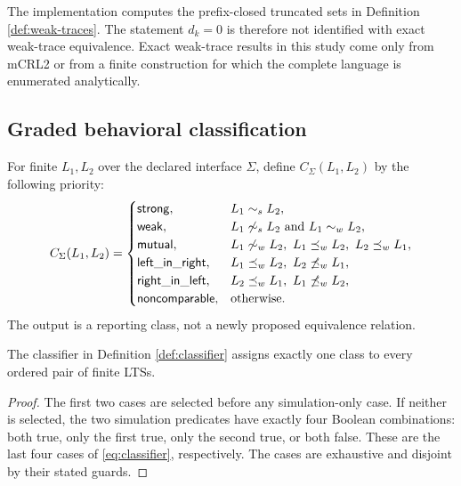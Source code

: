 \documentclass{ws-jbcb}
\numberwithin{equation}{section}
\newcommand{\strongsim}{\mathrel{\sim_{s}}}
\newcommand{\weaksim}{\mathrel{\sim_{w}}}
\newcommand{\weakpre}{\mathrel{\preceq_{w}}}
\begin{document}
The implementation computes the prefix-closed truncated sets in Definition
\ref{def:weak-traces}. The statement $d_k=0$ is therefore not identified with
exact weak-trace equivalence. Exact weak-trace results in this study come only
from mCRL2 or from a finite construction for which the complete language is
enumerated analytically.

\subsection{Graded behavioral classification}\label{sec:decision}

\begin{definition}\label{def:classifier}
For finite $L_1,L_2$ over the declared interface $\Sigma$, define
$C_{\Sigma}(L_1,L_2)$ by the following priority:
\begin{equation}\label{eq:classifier}
C_{\Sigma}(L_1,L_2)=
\begin{cases}
\mathsf{strong}, & L_1\strongsim L_2,\\
\mathsf{weak}, & L_1\not\strongsim L_2\text{ and }L_1\weaksim L_2,\\
\mathsf{mutual}, & L_1\not\weaksim L_2,\ L_1\weakpre L_2,\ L_2\weakpre L_1,\\
\mathsf{left\_in\_right}, & L_1\weakpre L_2,\ L_2\not\weakpre L_1,\\
\mathsf{right\_in\_left}, & L_2\weakpre L_1,\ L_1\not\weakpre L_2,\\
\mathsf{noncomparable}, & \text{otherwise}.
\end{cases}
\end{equation}
The output is a reporting class, not a newly proposed equivalence relation.
\end{definition}

\begin{proposition}\label{prop:classifier}
The classifier in Definition \ref{def:classifier} assigns exactly one class to
every ordered pair of finite LTSs.
\end{proposition}

\begin{proof}
The first two cases are selected before any simulation-only case. If neither is
selected, the two simulation predicates have exactly four Boolean combinations:
both true, only the first true, only the second true, or both false. These are the
last four cases of \eqref{eq:classifier}, respectively. The cases are exhaustive
and disjoint by their stated guards.
\end{proof}
\end{document}
